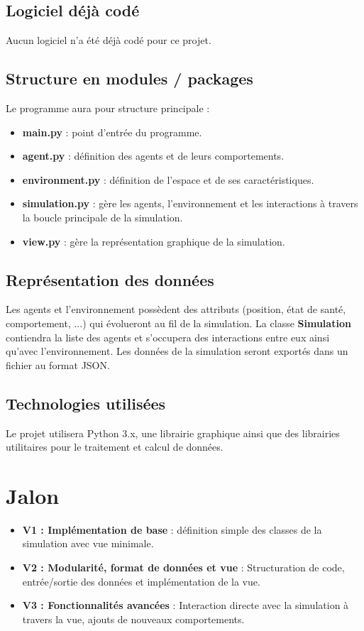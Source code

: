 \documentclass{article}
\begin{document}
\subsection{Logiciel déjà codé}
Aucun logiciel n'a été déjà codé pour ce projet.

\subsection{Structure en modules / packages}
Le programme aura pour structure principale :
\begin{itemize}
    \item \textbf{main.py} : point d'entrée du programme.
    \item \textbf{agent.py} : définition des agents et de leurs comportements.
    \item \textbf{environment.py} : définition de l'espace et de ses caractéristiques.
    \item \textbf{simulation.py} : gère les agents, l'environnement et les interactions à travers la boucle principale de la simulation.
    \item \textbf{view.py} : gère la représentation graphique de la simulation.
\end{itemize}

\subsection{Représentation des données}
Les agents et l'environnement possèdent des attributs (position, état de santé, comportement, ...) qui évolueront au fil de la simulation. 
La classe \textbf{Simulation} contiendra la liste des agents et s'occupera des interactions entre eux ainsi qu'avec l'environnement.
Les données de la simulation seront exportés dans un fichier au format JSON.

\subsection{Technologies utilisées}
Le projet utilisera Python 3.x, une librairie graphique ainsi que des librairies utilitaires pour le traitement et calcul de données.

\section{Jalon}
\begin{itemize}
    \item \textbf{V1 : Implémentation de base} : définition simple des classes de la simulation avec vue minimale.
    \item \textbf{V2 : Modularité, format de données et vue} : Structuration de code, entrée/sortie des données et implémentation de la vue.
    \item \textbf{V3 : Fonctionnalités avancées} : Interaction directe avec la simulation à travers la vue, ajouts de nouveaux comportements.
\end{itemize}
\end{document}
